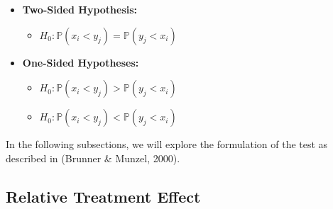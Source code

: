 \documentclass[pdflatex,sn-mathphys-num]{sn-jnl}
\theoremstyle{thmstyleone}
\theoremstyle{thmstyletwo}
\theoremstyle{thmstylethree}
\begin{document}
        \begin{itemize}
            \item \begin{center} \textbf{Two-Sided Hypothesis:} 
                \begin{itemize}
                    \item \begin{center} $H_{0}: \mathds{P}\left(  x_i < y_j \right) = \mathds{P}\left(  y_j < x_i \right)$
                    \end{center}
                \end{itemize}
            \end{center}
            
            \item \begin{center} \textbf{One-Sided Hypotheses:}
                \begin{itemize}
                    \item \begin{center} $H_{0}: \mathds{P}\left(  x_i < y_j \right) > \mathds{P}\left(  y_j < x_i \right)$
                    \end{center}

                    \vspace{5pt}
                    
                    \item \begin{center}$H_{0}: \mathds{P}\left(  x_i < y_j \right) < \mathds{P}\left(  y_j < x_i \right)$
                    \end{center}
                \end{itemize}
            \end{center}
        \end{itemize}
        
        \vspace{10pt}

        In the following subsections, we will explore the formulation of the test as described in (Brunner \& Munzel, 2000).

        \subsection{Relative Treatment Effect}
\end{document}

